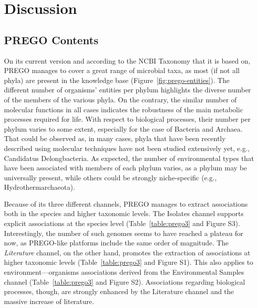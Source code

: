 \section{Discussion}
\label{sec:prego-discussion}

   \subsection{PREGO Contents}
   \label{subsec:prego-contents-disc}

   On its current version and according to the NCBI Taxonomy that it is based on, PREGO manages to cover a great range of microbial taxa, as most (if not all phyla) are present in the knowledge base (Figure~\ref{fig:prego-entities}). 
   The different number of organisms' entities per phylum highlights the diverse number of the members of the various phyla. On the contrary, the similar number of molecular functions in all cases indicates the robustness of the main metabolic processes required for life. 
   With respect to biological processes, their number per phylum varies to some extent, especially for the case of Bacteria and Archaea. 
   That could be observed as, in many cases, phyla that have been recently described using molecular techniques have not been studied extensively yet, e.g., Candidatus Delongbacteria. 
   As expected, the number of environmental types that have been associated with members of each phylum varies, as a phylum may be universally present, while others could be strongly niche-specific (e.g., Hydrothermarchaeota).

   Because of its three different channels, PREGO manages to extract associations both in the species and higher taxonomic levels. The Isolates channel supports explicit associations at the species level (Table~\ref{table:prego3} and Figure S3). 
   Interestingly, the number of such genomes seems to have reached a plateau for now, as PREGO-like platforms include the same order of magnitude. 
   The \textit{Literature} channel, on the other hand, promotes the extraction of associations at higher taxonomic levels (Table~\ref{table:prego3} and Figure S1). 
   This also applies to environment—organisms associations derived from the Environmental Samples channel (Table~\ref{table:prego3} and Figure S2). Associations regarding biological processes, though, are strongly enhanced by the Literature channel and the massive increase of literature.


